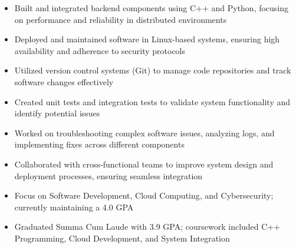 \par\smallskip
\noindent
\begin{minipage}{20cm}
  \begin{minipage}{9.75cm}
    \begin{itemize}
      \item Built and integrated backend components using C++ and Python, focusing on performance and reliability in distributed environments
      \item Deployed and maintained software in Linux-based systems, ensuring high availability and adherence to security protocols
      \item Utilized version control systems (Git) to manage code repositories and track software changes effectively
    \end{itemize}
  \end{minipage}
  \hfill
  \begin{minipage}{9.75cm}
    \begin{itemize}
      \item Created unit tests and integration tests to validate system functionality and identify potential issues
      \item Worked on troubleshooting complex software issues, analyzing logs, and implementing fixes across different components
      \item Collaborated with cross-functional teams to improve system design and deployment processes, ensuring seamless integration
    \end{itemize}
  \end{minipage}
\end{minipage}

\begin{itemize}
  \item Focus on Software Development, Cloud Computing, and Cybersecurity; currently maintaining a 4.0 GPA
\end{itemize}
\divider

\begin{itemize}
  \item Graduated Summa Cum Laude with 3.9 GPA; coursework included C++ Programming, Cloud Development, and System Integration
\end{itemize}

\noindent
\begin{minipage}{20cm}
      
    
      
\end{minipage}


